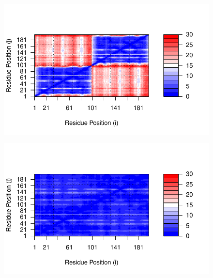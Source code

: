 \documentclass[
  letterpaper,
  DIV=11,
  numbers=noendperiod]{scrartcl}
\newenvironment{Shaded}{\begin{snugshade}}{\end{snugshade}}
\newcommand{\AttributeTok}[1]{\textcolor[rgb]{0.40,0.45,0.13}{#1}}
\newcommand{\DecValTok}[1]{\textcolor[rgb]{0.68,0.00,0.00}{#1}}
\newcommand{\FunctionTok}[1]{\textcolor[rgb]{0.28,0.35,0.67}{#1}}
\newcommand{\NormalTok}[1]{\textcolor[rgb]{0.00,0.23,0.31}{#1}}
\newcommand{\SpecialCharTok}[1]{\textcolor[rgb]{0.37,0.37,0.37}{#1}}
\newcommand{\StringTok}[1]{\textcolor[rgb]{0.13,0.47,0.30}{#1}}
\begin{document}
\begin{figure}[H]

{\centering \includegraphics{Class11INCLASS_files/figure-pdf/unnamed-chunk-32-1.pdf}

}

\end{figure}

\begin{Shaded}
\end{Shaded}

\begin{figure}[H]

{\centering \includegraphics{Class11INCLASS_files/figure-pdf/unnamed-chunk-33-1.pdf}

}

\end{figure}
\end{document}
